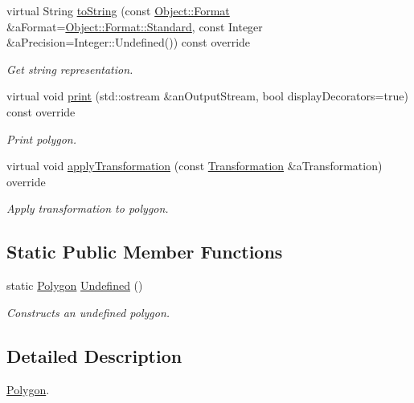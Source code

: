 \begin{DoxyCompactItemize}
virtual String \hyperlink{classlibrary_1_1math_1_1geom_1_1d2_1_1objects_1_1_polygon_acef17857f29323e985fba23441ed1171}{to\+String} (const \hyperlink{classlibrary_1_1math_1_1geom_1_1d2_1_1_object_ac8cd61dada4960cfee9a469231621b17}{Object\+::\+Format} \&a\+Format=\hyperlink{classlibrary_1_1math_1_1geom_1_1d2_1_1_object_ac8cd61dada4960cfee9a469231621b17aeb6d8ae6f20283755b339c0dc273988b}{Object\+::\+Format\+::\+Standard}, const Integer \&a\+Precision=Integer\+::\+Undefined()) const override
\begin{DoxyCompactList}\small\item\em Get string representation. \end{DoxyCompactList}\item 
virtual void \hyperlink{classlibrary_1_1math_1_1geom_1_1d2_1_1objects_1_1_polygon_a028ca7818387654ed1aab1584cee6cc5}{print} (std\+::ostream \&an\+Output\+Stream, bool display\+Decorators=true) const override
\begin{DoxyCompactList}\small\item\em Print polygon. \end{DoxyCompactList}\item 
virtual void \hyperlink{classlibrary_1_1math_1_1geom_1_1d2_1_1objects_1_1_polygon_a920b30eb110c7164f65754979da17638}{apply\+Transformation} (const \hyperlink{classlibrary_1_1math_1_1geom_1_1d2_1_1_transformation}{Transformation} \&a\+Transformation) override
\begin{DoxyCompactList}\small\item\em Apply transformation to polygon. \end{DoxyCompactList}\end{DoxyCompactItemize}
\subsection*{Static Public Member Functions}
\begin{DoxyCompactItemize}
\item 
static \hyperlink{classlibrary_1_1math_1_1geom_1_1d2_1_1objects_1_1_polygon}{Polygon} \hyperlink{classlibrary_1_1math_1_1geom_1_1d2_1_1objects_1_1_polygon_a86e2c184f51c1e93fce5a786457b9fc3}{Undefined} ()
\begin{DoxyCompactList}\small\item\em Constructs an undefined polygon. \end{DoxyCompactList}\end{DoxyCompactItemize}


\subsection{Detailed Description}
\hyperlink{classlibrary_1_1math_1_1geom_1_1d2_1_1objects_1_1_polygon}{Polygon}. 


